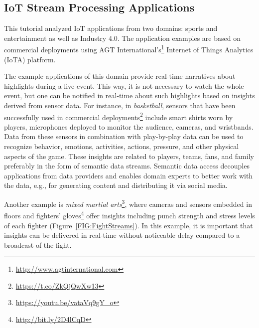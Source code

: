 \subsection{IoT Stream Processing Applications}
This tutorial analyzed IoT applications from two domains: sports and entertainment as well as Industry 4.0. The application examples are based on commercial deployments using AGT International's\footnote{\url{http://www.agtinternational.com}} Internet of Things Analytics (IoTA) platform.

The example applications of this domain provide real-time narratives about highlights during a live event. This way, it is not necessary to watch the whole event, but one can be notified in real-time about such highlights based on insights derived from sensor data. For instance, in \emph{basketball}, sensors that have been successfully used in commercial deployments\footnote{\url{https://t.co/ZkQjQwXw13}} include smart shirts worn by players, microphones deployed to monitor the audience,  cameras, and wristbands. Data from these sensors in combination with play-by-play data can be used to recognize behavior, emotions, activities, actions, pressure, and other physical aspects of the game. These insights are related to players, teams, fans, and family preferably in the form of semantic data streams. Semantic data access decouples applications from data providers and enables domain experts to better work with the data, e.g., for generating content and distributing it via social media.

Another example is \emph{mixed martial
  arts}\footnote{\url{https://youtu.be/vataVq9gY_o}}, where cameras
and sensors embedded in floors and fighters'
gloves\footnote{\url{http://bit.ly/2D4lCqD}} offer insights including
punch strength and stress levels of each fighter
(Figure~\ref{FIG:FightStreams}). In this example, it is important that
insights can be delivered in real-time without noticeable delay
compared to a broadcast of the fight.

